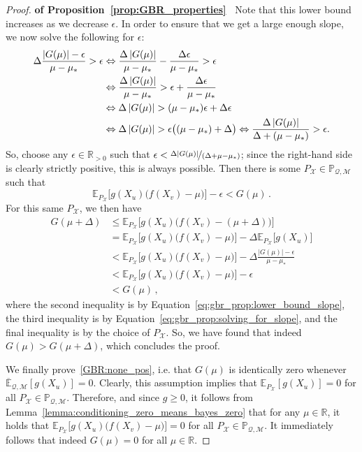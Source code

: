 \documentclass[twoside,11pt]{article}
\newcommand{\reals}{\mathbb{R}}
\newcommand{\realspos}{\reals_{>0}}
\newcommand{\states}{\mathcal{X}}
\newcommand{\uexp}{\overline{\mathbb{E}}_{\rateset,\mathcal{M}}}
\newcommand{\rateset}{\mathcal{Q}}
\newcommand{\asa}{\Leftrightarrow}
\newcommand{\abs}[1]{\left\vert #1 \right\vert}
\begin{document}
\begin{proof}{\bf of Proposition~\ref{prop:GBR_properties}~}
Note that this lower bound increases as we decrease $\epsilon$. In order to ensure that we get a large enough slope, we now solve the following for $\epsilon$:
\begin{align}
\Delta\frac{\abs{G(\mu)}-\epsilon}{\mu-\mu_*} > \epsilon 
&\asa
\frac{\Delta\abs{G(\mu)}}{\mu-\mu_*} - \frac{\Delta\epsilon}{\mu-\mu_*} > \epsilon\notag\\
&\asa
\frac{\Delta\abs{G(\mu)}}{\mu-\mu_*} > \epsilon + \frac{\Delta\epsilon}{\mu-\mu_*} \notag\\
&\asa\Delta\abs{G(\mu)} > (\mu-\mu_*)\epsilon + \Delta\epsilon \notag\\
&\asa\Delta\abs{G(\mu)} > \epsilon\bigl((\mu-\mu_*) + \Delta\bigr)
\asa
\frac{\Delta\abs{G(\mu)}}{\Delta + (\mu-\mu_*)} > \epsilon.\label{eq:gbr_prop:solving_for_slope}
\end{align}
So, choose any $\epsilon\in\realspos$ such that $\epsilon< \nicefrac{\Delta\abs{G(\mu)}}{(\Delta + \mu-\mu_*)}$; since the right-hand side is clearly strictly positive, this is always possible. Then there is some $P_\states\in\mathbb{P}_{\rateset,\mathcal{M}}$ such that
\begin{equation*}
\mathbb{E}_{P_\states}\bigl[g(X_u)\bigl(f(X_v)-\mu\bigr)\bigr] - \epsilon < G(\mu)\,.
\end{equation*}
For this same $P_\states$, we then have
\begin{align*}
G(\mu+\Delta) &\leq \mathbb{E}_{P_\states}\bigl[g(X_u)\bigl(f(X_v)-(\mu+\Delta)\bigr)\bigr] \\
 &= \mathbb{E}_{P_\states}\bigl[g(X_u)\bigl(f(X_v)-\mu\bigr)\bigr] - \Delta\mathbb{E}_{P_\states}\bigl[g(X_u)\bigr] \\
 &< \mathbb{E}_{P_\states}\bigl[g(X_u)\bigl(f(X_v)-\mu\bigr)\bigr] - \Delta\frac{\abs{G(\mu)}-\epsilon}{\mu-\mu_*} \\
 &< \mathbb{E}_{P_\states}\bigl[g(X_u)\bigl(f(X_v)-\mu\bigr)\bigr] - \epsilon \\
 &< G(\mu)\,,
\end{align*}
where the second inequality is by Equation~\eqref{eq:gbr_prop:lower_bound_slope}, the third inequality is by Equation~\eqref{eq:gbr_prop:solving_for_slope}, and the final inequality is by the choice of $P_\states$. So, we have found that indeed $G(\mu)>G(\mu+\Delta)$, which concludes the proof.

We finally prove~\ref{GBR:none_pos}, i.e. that $G(\mu)$ is identically zero whenever $\uexp[g(X_u)]=0$. Clearly, this assumption implies that $\mathbb{E}_{P_\states}[g(X_u)]=0$ for all $P_\states\in\mathbb{P}_{\rateset,\mathcal{M}}$. Therefore, and since $g\geq 0$, it follows from Lemma~\ref{lemma:conditioning_zero_means_bayes_zero} that for any $\mu\in\reals$, it holds that $\mathbb{E}_{P_\states}\bigl[g(X_u)\bigl(f(X_v) - \mu\bigr)\bigr]=0$ for all $P_\states\in\mathbb{P}_{\rateset,\mathcal{M}}$. It immediately follows that indeed $G(\mu)=0$ for all $\mu\in\reals$.
\end{proof}
\end{document}
